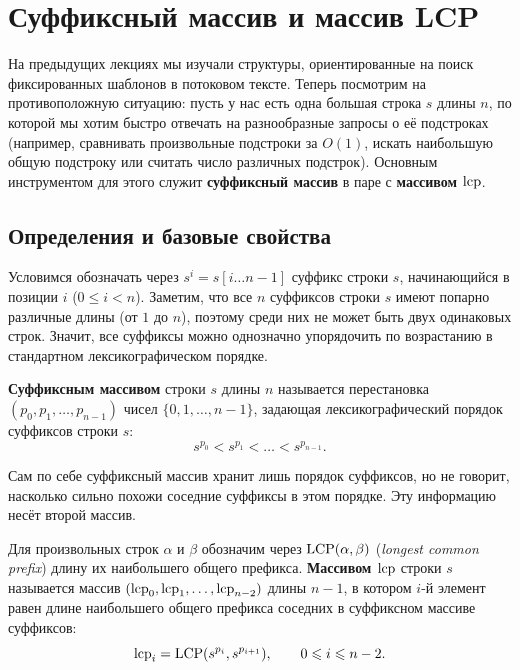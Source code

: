 \section{Суффиксный массив и массив LCP}

На предыдущих лекциях мы изучали структуры, ориентированные на поиск фиксированных шаблонов в потоковом тексте. Теперь посмотрим на противоположную ситуацию: пусть у нас есть одна большая строка $s$ длины $n$, по которой мы хотим быстро отвечать на разнообразные запросы о её подстроках (например, сравнивать произвольные подстроки за $O(1)$, искать наибольшую общую подстроку или считать число различных подстрок). Основным инструментом для этого служит \textbf{суффиксный массив} в паре с \textbf{массивом $\operatorname{lcp}$}.

\subsection{Определения и базовые свойства}

Условимся обозначать через $s^i = s[i \dots n-1]$ суффикс строки $s$, начинающийся в позиции $i$ ($0 \le i < n$). Заметим, что все $n$ суффиксов строки $s$ имеют попарно различные длины (от $1$ до $n$), поэтому среди них не может быть двух одинаковых строк. Значит, все суффиксы можно однозначно упорядочить по возрастанию в стандартном лексикографическом порядке.

\begin{definition}
    \textbf{Суффиксным массивом} строки $s$ длины $n$ называется перестановка $(p_0, p_1, \dots, p_{n-1})$ чисел $\{0, 1, \dots, n-1\}$, задающая лексикографический порядок суффиксов строки $s$:
    \[
        s^{p_0} < s^{p_1} < \dots < s^{p_{n-1}}.
    \]
\end{definition}

Сам по себе суффиксный массив хранит лишь порядок суффиксов, но не говорит, насколько сильно похожи соседние суффиксы в этом порядке. Эту информацию несёт второй массив.

\begin{definition}
    Для произвольных строк $\alpha$ и $\beta$ обозначим через $\operatorname{LCP}(\alpha, \beta)$ (\textit{longest common prefix}) длину их наибольшего общего префикса. \textbf{Массивом $\operatorname{lcp}$} строки $s$ называется массив $(\operatorname{lcp}_0, \operatorname{lcp}_1, \dots, \operatorname{lcp}_{n-2})$ длины $n-1$, в котором $i$-й элемент равен длине наибольшего общего префикса соседних в суффиксном массиве суффиксов:
    \[
        \operatorname{lcp}_i = \operatorname{LCP}(s^{p_i}, s^{p_{i+1}}), \qquad 0 \leqslant i \leqslant n-2.
    \]
\end{definition}

